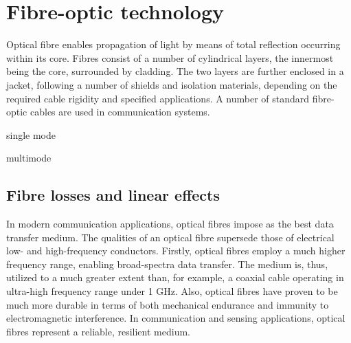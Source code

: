 \documentclass{standalone}
\begin{document}
\chapter{Fibre-optic technology} \label{ch:fibres}
\setcounter{page}\thestranica


Optical fibre enables propagation of light by means of total reflection occurring within its core. Fibres consist of a number of cylindrical layers, the innermost being the core, surrounded by cladding. The two layers are further enclosed in a jacket, following a number of shields and isolation materials, depending on the required cable rigidity and specified applications. A number of standard fibre-optic cables are used in communication systems.

single mode

multimode

\section{Fibre losses and linear effects}

In modern communication applications, optical fibres impose as the best data transfer medium. The qualities of an optical fibre supersede those of electrical low- and high-frequency conductors. Firstly, optical fibres employ a much higher frequency range, enabling broad-spectra data transfer. The medium is, thus, utilized to a much greater extent than, for example, a coaxial cable operating in ultra-high frequency range under 1 GHz. Also, optical fibres have proven to be much more durable in terms of both mechanical endurance and immunity to electromagnetic interference. In communication and sensing applications, optical fibres represent a reliable, resilient medium. \\
\end{document}
